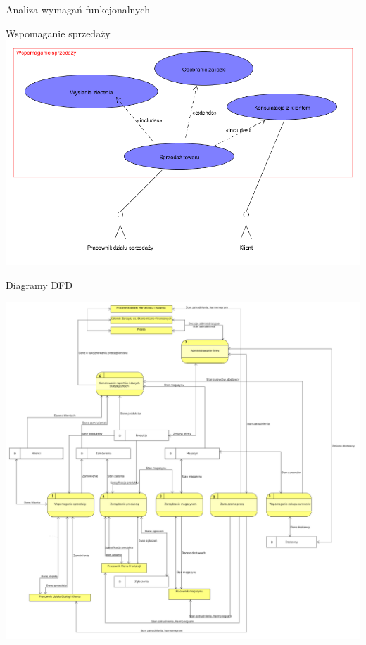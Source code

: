 \documentclass{beamer}
\begin{document}
\begin{frame}{Analiza wymagań funkcjonalnych}
\begin{block}{Wspomaganie sprzedaży}
\centering
\includegraphics[scale=0.25]{Sprzedaz_towaru.png}
\end{block}


\end{frame}

\begin{frame}{Diagramy DFD}
\begin{block}
\centering
\includegraphics[scale=0.12]{DFD0.png}
\end{block}
\end{frame}
\end{document}
